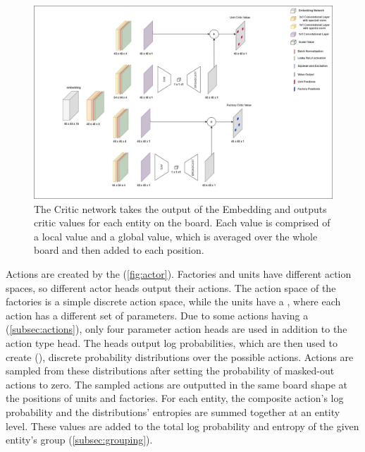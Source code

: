 \bigskip

\begin{figure}[htbp]
    \centering
    \includegraphics[width=0.9\linewidth]{images/methods_hybrid/actor_critic/critic.png}
    \captionsetup{justification=justified, singlelinecheck=false, width=1\linewidth, labelfont=bf} 
    \caption[]{The Critic network takes the output of the Embedding and outputs critic values for each entity on the board. Each value is comprised of a local value and a global value, which is averaged over the whole board and then added to each position.}
    \label{fig:critic}
\end{figure}

\noindent Actions are created by the  (\autoref{fig:actor}). Factories and units have different action spaces, so different actor heads output their actions. The action space of the factories is a simple discrete action space, while the units have a , where each action has a different set of parameters. Due to some actions having a  (\autoref{subsec:actions}), only four parameter action heads are used in addition to the action type head. The heads output log probabilities, which are then used to create  (\cite{categorical}), discrete probability distributions over the possible actions. Actions are sampled from these distributions after setting the probability of masked-out actions to zero. The sampled actions are outputted in the same board shape at the positions of units and factories. For each entity, the composite action's log probability and the distributions' entropies are summed together at an entity level. These values are added to the total log probability and entropy of the given entity's group (\autoref{subsec:grouping}).

